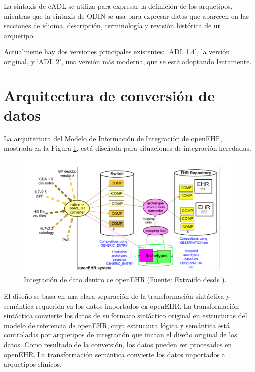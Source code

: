 La sintaxis de cADL se utiliza para expresar la definición de los arquetipos, mientras que la sintaxis de ODIN se usa para expresar datos que aparecen en las secciones de idioma, descripción, terminología y revisión histórica de un arquetipo.

Actualmente hay dos versiones principales existentes: `ADL 1.4', la versión original, y `ADL 2', una versión más moderna, que se está adoptando lentamente.

\section{Arquitectura de conversión de datos}

La arquitectura del Modelo de Información de Integración de openEHR, mostrada en la Figura \ref{fig:data_conversion_architecture}, está diseñada para situaciones de integración heredadas.

\begin{figure}[h]
  \centering
  \includegraphics[scale=0.4]{./images/data_conversion_architecture.png}
  \caption{Integración de dato dentro de openEHR (Fuente: Extraído desde \cite{openEHR}).}
  \label{fig:data_conversion_architecture}
\end{figure}

El diseño se basa en una clara separación de la transformación sintáctica y semántica requerida en los datos importados en openEHR. La transformación sintáctica convierte los datos de su formato sintáctico original en estructuras del modelo de referencia de openEHR, cuya estructura lógica y semántica está controladas por arquetipos de integración que imitan el diseño original de los datos. Como resultado de la conversión, los datos pueden ser procesados en openEHR. La transformación semántica convierte los datos importados a arquetipos clínicos.

